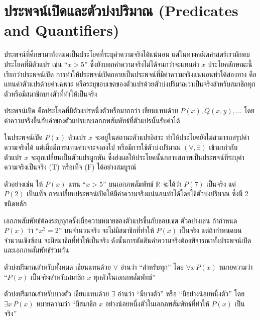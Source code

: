 \section{ประพจน์เปิดและตัวบ่งปริมาณ (Predicates and Quantifiers)}

ประพจน์ที่ศึกษามาทั้งหมดเป็นประโยคที่ระบุค่าความจริงได้แน่นอน แต่ในทางคณิตศาสตร์เรามักพบประโยคที่มีตัวแปร เช่น ``$x > 5$'' ซึ่งยังบอกค่าความจริงไม่ได้จนกว่าจะแทนค่า $x$ ประโยคลักษณะนี้เรียกว่าประพจน์เปิด การทำให้ประพจน์เปิดกลายเป็นประพจน์ที่มีค่าความจริงแน่นอนทำได้สองทาง คือแทนค่าตัวแปรด้วยค่าเฉพาะ หรือระบุขอบเขตของตัวแปรด้วยตัวบ่งปริมาณว่าเป็นจริงสำหรับสมาชิกทุกตัวหรือมีสมาชิกบางตัวที่ทำให้เป็นจริง~\parencite{velleman2019prove}

\begin{definition}[ประพจน์เปิด]
ประพจน์เปิด คือประโยคที่มีตัวแปรหนึ่งตัวหรือมากกว่า เขียนแทนด้วย $P(x), Q(x,y), \ldots$ โดยค่าความจริงขึ้นกับค่าของตัวแปรและเอกภพสัมพัทธ์ที่ตัวแปรนั้นรับค่าได้
\end{definition}

ในประพจน์เปิด $P(x)$ ตัวแปร $x$ จะอยู่ในสถานะตัวแปรอิสระ ทำให้ประโยคยังไม่สามารถสรุปค่าความจริงได้ แต่เมื่อมีการแทนค่าเจาะจงลงไป หรือมีการใช้ตัวบ่งปริมาณ $(\forall, \exists)$ เข้ามากำกับ ตัวแปร $x$ จะถูกเปลี่ยนเป็นตัวแปรผูกพัน ซึ่งส่งผลให้ประโยคนั้นกลายสภาพเป็นประพจน์ที่ระบุค่าความจริงเป็นจริง ($\text{T}$) หรือเท็จ ($\text{F}$) ได้อย่างสมบูรณ์

ตัวอย่างเช่น ให้ $P(x)$ แทน ``$x > 5$'' บนเอกภพสัมพัทธ์ $\mathbb{R}$ จะได้ว่า $P(7)$ เป็นจริง แต่ $P(2)$ เป็นเท็จ การเปลี่ยนประพจน์เปิดให้มีค่าความจริงแน่นอนทำได้โดยใช้ตัวบ่งปริมาณ ซึ่งมี 2 ชนิดหลัก

เอกภพสัมพัทธ์ต้องระบุทุกครั้งเมื่อความหมายของตัวแปรขึ้นกับขอบเขต ตัวอย่างเช่น ถ้ากำหนด $P(x)$ ว่า ``$x^2=2$'' บนจำนวนจริง จะไม่มีสมาชิกที่ทำให้ $P(x)$ เป็นจริง แต่ถ้ากำหนดบนจำนวนเชิงซ้อน จะมีสมาชิกที่ทำให้เป็นจริง ดังนั้นการตัดสินค่าความจริงต้องพิจารณาทั้งประพจน์เปิดและเอกภพสัมพัทธ์ร่วมกัน

\begin{definition}
ตัวบ่งปริมาณสำหรับทั้งหมด เขียนแทนด้วย $\forall$ อ่านว่า ``สำหรับทุก'' โดย $\forall x\, P(x)$ หมายความว่า ``$P(x)$ เป็นจริงสำหรับสมาชิก $x$ ทุกตัวในเอกภพสัมพัทธ์''

ตัวบ่งปริมาณสำหรับบางตัว เขียนแทนด้วย $\exists$ อ่านว่า ``มีบางตัว'' หรือ ``มีอย่างน้อยหนึ่งตัว'' โดย $\exists x\, P(x)$ หมายความว่า ``มีสมาชิก $x$ อย่างน้อยหนึ่งตัวในเอกภพสัมพัทธ์ที่ทำให้ $P(x)$ เป็นจริง''
\end{definition}

